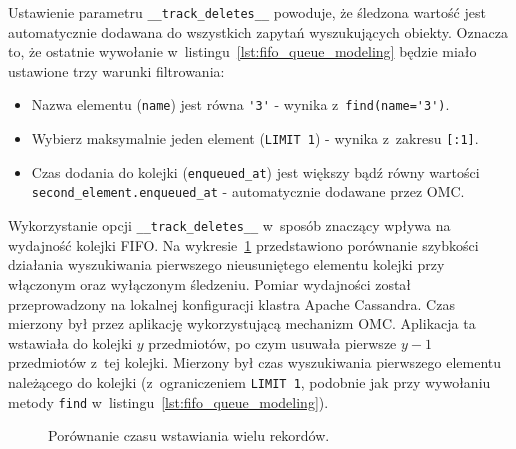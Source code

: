 Ustawienie parametru \verb+__track_deletes__+ powoduje, że śledzona wartość jest automatycznie dodawana do wszystkich zapytań wyszukujących obiekty. Oznacza to, że ostatnie wywołanie w~listingu~\ref{lst:fifo_queue_modeling} będzie miało ustawione trzy warunki filtrowania:

\begin{itemize}
	\item Nazwa elementu (\verb+name+) jest równa \verb+'3'+ - wynika z~\verb+find(name='3')+.
	\item Wybierz maksymalnie jeden element (\verb+LIMIT 1+) - wynika z~zakresu \verb+[:1]+.
	\item Czas dodania do kolejki (\verb+enqueued_at+) jest większy bądź równy wartości \verb+second_element.enqueued_at+ - automatycznie dodawane przez OMC.
\end{itemize}

Wykorzystanie opcji \verb+__track_deletes__+ w~sposób znaczący wpływa na wydajność kolejki FIFO. Na wykresie~\ref{fig:fifo_select_time_comparison} przedstawiono porównanie szybkości działania wyszukiwania pierwszego nieusuniętego elementu kolejki przy włączonym oraz wyłączonym śledzeniu. Pomiar wydajności został przeprowadzony na lokalnej konfiguracji klastra Apache Cassandra. Czas mierzony był przez aplikację wykorzystującą mechanizm OMC. Aplikacja ta wstawiała do kolejki $y$ przedmiotów, po czym usuwała pierwsze $y-1$ przedmiotów z~tej kolejki. Mierzony był czas wyszukiwania pierwszego elementu należącego do kolejki (z~ograniczeniem \verb+LIMIT 1+, podobnie jak przy wywołaniu metody \verb+find+ w~listingu~\ref{lst:fifo_queue_modeling}). 

\begin{figure}
	\centering

	\caption{Porównanie czasu wstawiania wielu rekordów.}
	\label{fig:fifo_select_time_comparison}
\end{figure}

